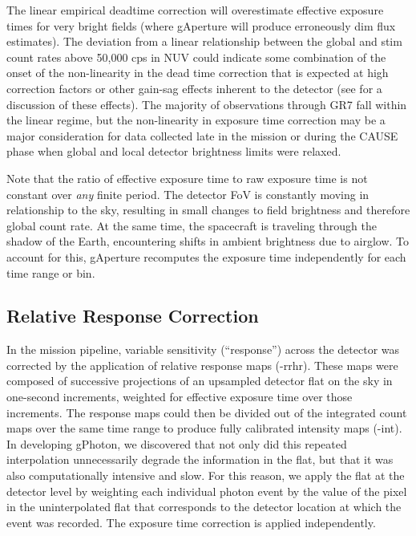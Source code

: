 \documentclass[preprint]{aastex}
\begin{document}
The linear empirical deadtime correction will overestimate effective exposure times for very bright fields (where gAperture will produce erroneously dim flux estimates). The deviation from a linear relationship between the global and stim count rates above 50,000 cps in NUV could indicate some combination of the onset of the non-linearity in the dead time correction that is expected at high correction factors or other gain-sag effects inherent to the detector (see \citep{mor2007} for a discussion of these effects). The majority of observations through GR7 fall within the linear regime, but the non-linearity in exposure time correction may be a major consideration for data collected late in the mission or during the CAUSE phase when global and local detector brightness limits were relaxed.

Note that the ratio of effective exposure time to raw exposure time is not constant over \emph{any} finite period. The detector FoV is constantly moving in relationship to the sky, resulting in small changes to field brightness and therefore global count rate. At the same time, the spacecraft is traveling through the shadow of the Earth, encountering shifts in ambient brightness due to airglow. To account for this, gAperture recomputes the exposure time independently for each time range or bin.

\subsection{Relative Response Correction}
\label{relresponsecorr}
In the mission pipeline, variable sensitivity (``response'') across the detector was corrected by the application of relative response maps (-rrhr). These maps were composed of successive projections of an upsampled detector flat on the sky in one-second increments, weighted for effective exposure time over those increments. The response maps could then be divided out of the integrated count maps over the same time range to produce fully calibrated intensity maps (-int). In developing gPhoton, we discovered that not only did this repeated interpolation unnecessarily degrade the information in the flat, but that it was also computationally intensive and slow. For this reason, we apply the flat at the detector level by weighting each individual photon event by the value of the pixel in the uninterpolated flat that corresponds to the detector location at which the event was recorded. The exposure time correction is applied independently.
\end{document}
